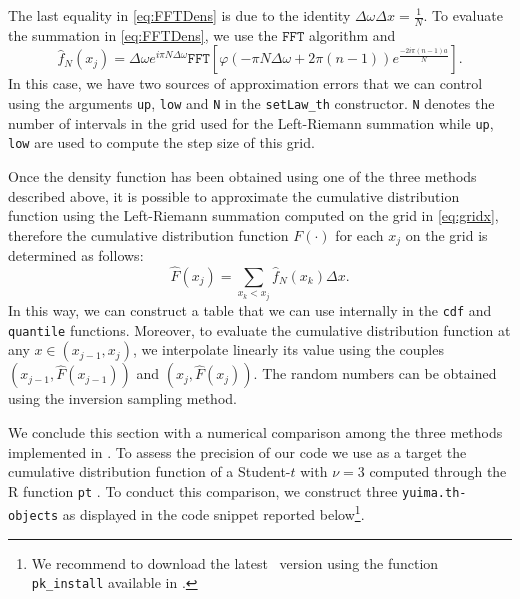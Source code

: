 The last equality in \eqref{eq:FFTDens} is due to the identity \(\Delta \omega \Delta x = \frac{1}{N}\). To evaluate the summation in \eqref{eq:FFTDens}, we use the \(\texttt{FFT}\) algorithm and
\begin{equation}
\hat{f}_{N}\left(x_j\right) = \Delta \omega e^{i\pi N \Delta \omega}\texttt{FFT}\left[\varphi\left(-\pi N\Delta \omega + 2\pi \left(n-1\right)\right)e^{ \frac{-2 i \pi \left(n-1\right)a}{N}}\right].
\end{equation}
In this case, we have two sources of approximation errors that we can control using the arguments \texttt{up}, \texttt{low} and \texttt{N} in the \texttt{setLaw\_th} constructor. \texttt{N} denotes the number of intervals in the grid used for the Left-Riemann summation while \texttt{up}, \texttt{low} are used to compute the step size of this grid.

Once the density function has been obtained using one of the three methods described above, it is possible to approximate the cumulative distribution function using the Left-Riemann summation computed on the grid in \eqref{eq:gridx}, therefore the cumulative distribution function \(F\left(\cdot\right)\) for each \(x_j\) on the grid is determined as follows:
\begin{equation}
\hat{F}\left(x_j\right) = \sum_{x_k<x_j}\hat{f}_{N}\left(x_k\right)\Delta x.
\end{equation}
In this way, we can construct a table that we can use internally in the \texttt{cdf} and \texttt{quantile} functions. Moreover, to evaluate the cumulative distribution function at any \(x\in \left( x_{j-1}, x_j \right)\), we interpolate linearly its value using the couples \(\left(x_{j-1}, \hat{F}\left(x_{j-1}\right)\right)\) and \(\left(x_{j}, \hat{F}\left(x_{j}\right)\right)\). The random numbers can be obtained using the inversion sampling method.

We conclude this section with a numerical comparison among the three methods implemented in . To assess the precision of our code we use as a target the cumulative distribution function of a Student-\(t\) with \(\nu = 3\) computed through the \textsf{R} function \texttt{pt} \citep{Man}. To conduct this comparison, we construct three \texttt{yuima.th-objects} as displayed in the code snippet reported below\footnote{We recommend to download the latest  ~version using the function \texttt{pk\_install} available in  \citet{pak}.}.

